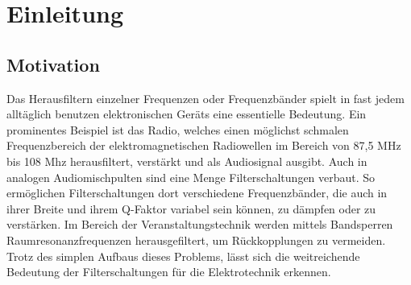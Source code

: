 \section{Einleitung}

\subsection{Motivation}
Das Herausfiltern einzelner Frequenzen oder Frequenzbänder spielt in fast jedem alltäglich benutzen elektronischen Geräts eine essentielle Bedeutung. Ein prominentes Beispiel ist das Radio, welches einen möglichst schmalen Frequenzbereich der elektromagnetischen Radiowellen im Bereich von 87,5 MHz bis 108 Mhz \cite{radio} herausfiltert, verstärkt und als Audiosignal ausgibt.
Auch in analogen Audiomischpulten sind eine Menge Filterschaltungen verbaut. So ermöglichen Filterschaltungen dort verschiedene Frequenzbänder, die auch in ihrer Breite und ihrem Q-Faktor variabel sein können, zu dämpfen oder zu verstärken. Im Bereich der Veranstaltungstechnik werden mittels Bandsperren Raumresonanzfrequenzen herausgefiltert, um Rückkopplungen zu vermeiden. Trotz des simplen Aufbaus dieses Problems, lässt sich die weitreichende Bedeutung der Filterschaltungen für die Elektrotechnik erkennen.

